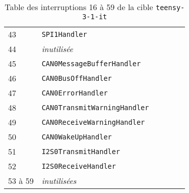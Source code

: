 \begin{table}[!t]
\begin{tabular}{llllll}
    43  & \texttt{SPI1Handler}\\
    44  & \emph{inutilisée} \\
    45  & \texttt{CAN0MessageBufferHandler}\\
    46  & \texttt{CAN0BusOffHandler}\\
    47  & \texttt{CAN0ErrorHandler}\\
    48  & \texttt{CAN0TransmitWarningHandler}\\
    49  & \texttt{CAN0ReceiveWarningHandler}\\
    50  & \texttt{CAN0WakeUpHandler}\\
    51  & \texttt{I2S0TransmitHandler}\\
    52  & \texttt{I2S0ReceiveHandler}\\
    53 à 59  & \emph{inutilisées} \\
  \end{tabular}
  \caption{Table des interruptions 16 à 59 de la cible \texttt{teensy-3-1-it}}
  \ligne
\end{table}

